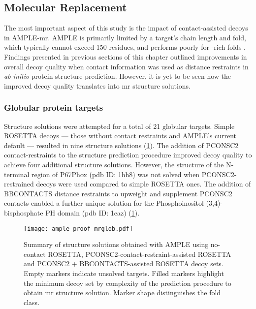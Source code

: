 \subsection{Molecular Replacement}
The most important aspect of this study is the impact of contact-assisted decoys in AMPLE-\gls{mr}. AMPLE is primarily limited by a target's chain length and fold, which typically cannot exceed 150 residues, and performs poorly for \textbeta-rich folds \cite{Bibby2012-lm}. Findings presented in previous sections of this chapter outlined improvements in overall decoy quality when contact information was used as distance restraints in \textit{ab initio} protein structure prediction. However, it is yet to be seen how the improved decoy quality translates into \gls{mr} structure solutions.

\subsubsection{Globular protein targets}
Structure solutions were attempted for a total of 21 globular targets. Simple ROSETTA decoys --- those without contact restraints and AMPLE's current default --- resulted in nine structure solutions (\cref{fig:ample_proof_mrglob}). The addition of PCONSC2 contact-restraints to the structure prediction procedure improved decoy quality to achieve four additional structure solutions. However, the structure of the N-terminal region of P67Phox (\gls{pdb} ID: 1hh8) was not solved when PCONSC2-restrained decoys were used compared to simple ROSETTA ones. The addition of BBCONTACTS distance restraints to upweight and supplement PCONSC2 contacts enabled a further unique solution for the Phosphoinositol (3,4)-bisphosphate PH domain (\gls{pdb} ID: 1eaz) (\cref{fig:ample_proof_mrglob}).

\begin{figure}[H]
    \centering
    \texttt{[image: ample\_proof\_mrglob.pdf]}
    \caption[Structure solution summary for globular targets]{Summary of structure solutions obtained with AMPLE using no-contact ROSETTA, PCONSC2-contact-restraint-assisted ROSETTA and PCONSC2 + BBCONTACTS-assisted ROSETTA decoy sets. Empty markers indicate unsolved targets. Filled markers highlight the minimum decoy set by complexity of the prediction procedure to obtain \gls{mr} structure solution. Marker shape distinguishes the fold class.}
    \label{fig:ample_proof_mrglob}
\end{figure}

